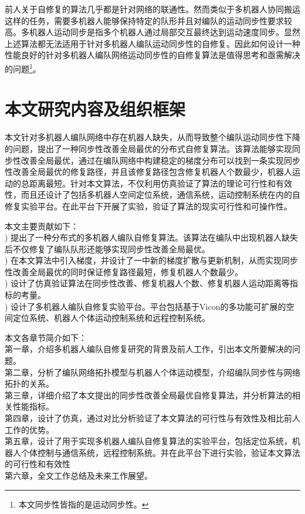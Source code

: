 前人关于自修复的算法几乎都是针对网络的联通性。然而类似于多机器人协同搬运这样的任务，需要多机器人能够保持特定的队形并且对编队的运动同步性要求较高。多机器人运动同步是指多个机器人通过局部交互最终达到运动速度同步\supercite{张飞2008移动机器人覆盖问题的研究,Zhang2006Motion}。显然上述算法都无法适用于针对多机器人编队运动同步性的自修复。因此如何设计一种性能良好的针对多机器人编队网络运动同步性的自修复算法是值得思考和亟需解决的问题\footnote{本文同步性皆指的是运动同步性。}。

\section{本文研究内容及组织框架}
本文针对多机器人编队网络中存在机器人缺失，从而导致整个编队运动同步性下降的问题，提出了一种同步性改善全局最优的分布式自修复算法。该算法能够实现同步性改善全局最优，通过在编队网络中构建稳定的梯度分布可以找到一条实现同步性改善全局最优的修复路径，并且该修复路径包含修复机器人个数最少，机器人运动的总距离最短。针对本文算法，不仅利用仿真验证了算法的理论可行性和有效性，而且还设计了包括多机器人空间定位系统，通信系统，运动控制系统在内的自修复实验平台。在此平台下开展了实验，验证了算法的现实可行性和可操作性。

本文主要贡献如下：\\
) 提出了一种分布式的多机器人编队自修复算法。该算法在编队中出现机器人缺失后不仅修复了编队队形还能够实现同步性改善全局最优。\\
) 在本文算法中引入梯度，并设计了一中新的梯度扩散与更新机制，从而实现同步性改善全局最优的同时保证修复路径最短，修复机器人个数最少。\\
) 设计了仿真验证算法在同步性改善、修复机器人个数、修复机器人运动距离等指标的考量。\\
) 设计了多机器人编队自修复实验平台。平台包括基于Vicon的多功能可扩展的空间定位系统、机器人个体运动控制系统和远程控制系统。

本文各章节简介如下：\\
\indent 第一章，介绍多机器人编队自修复研究的背景及前人工作，引出本文所要解决的问题。\\
\indent 第二章，分析了编队网络拓扑模型与机器人个体运动模型，介绍编队同步性与网络拓扑的关系。\\
\indent 第三章，详细介绍了本文提出的同步性改善全局最优自修复算法，并分析算法的相关性能指标。\\
\indent 第四章，设计了仿真，通过对比分析验证了本文算法的可行性与有效性及相比前人工作的优势。\\
\indent 第五章，设计了用于实现多机器人编队自修复算法的实验平台，包括定位系统，机器人个体控制与通信系统，远程控制系统。并在此平台下进行实验，验证本文算法的可行性和有效性\\
\indent 第六章，全文工作总结及未来工作展望。

